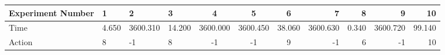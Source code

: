 \documentclass[8pt]{article}
\begin{document}
\begin{landscape}
\begin{tabular}{ | l | l | l | l | c | c | c | r | r | r | r | }
 \hline 
Experiment Number & 1 & 2 & 3 & 4 & 5 & 6 & 7 & 8 & 9 & 10\\ \hline
Time & 4.650 & 3600.310 & 14.200 & 3600.000 & 3600.450 & 38.060 & 3600.630 & 0.340 & 3600.720 & 99.140\\ \hline
Action & 8 & -1 & 8 & -1 & -1 & 9 & -1 & 6 & -1 & 10\\ \hline\end{tabular}
\end{landscape}
\end{document}
